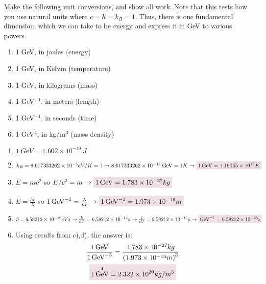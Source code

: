 \documentclass{article}
\date{Due: 01-19-2022}
\author{\EC}
\DeclareMathOperator{\GeV}{GeV}
\begin{document}
\maketitle
\begin{problem}
Make the following unit conversions, and show all work. 
Note that this tests how you use natural units where $c = \hbar = k_B = 1$. Thus, there is one 
fundamental dimension, which we can take to be energy and express it in GeV to various 
powers.
\begin{enumerate}[label=\alph*)]
    \item 1 GeV, in joules (energy) 
    \item 1 GeV, in Kelvin (temperature) 
    \item 1 GeV, in kilograms (mass) 
    \item 1 GeV$^{-1}$, in meters (length) 
    \item 1 GeV$^{-1}$, in seconds (time) 
    \item 1 GeV$^{4}$, in kg/m$^3$ (mass density) 
\end{enumerate}
\answerline
\begin{enumerate}[label=\alph*)]
    \item $1~GeV= 1.602\times10^{-10}~J$ 
    \item $k_B=8.617 333 262\times 10^{-5} eV/K=1
        \rightarrow
        8.617 333 262\times 10^{-14} \GeV=1K\rightarrow \coloredanswer{1\GeV=1.16045\times10^{13}K}$
    \item $E=mc^2$ so $E/c^2=m\rightarrow\coloredanswer{1\GeV=1.783 \times10^{-27} kg}$ 
    \item $E=\frac{hc}{\lambda}$ so $1\GeV^{-1}=\frac{\lambda}{hc}\rightarrow \coloredanswer{1\GeV^{-1}=1.973\times10^{-16}m}$
    \item $\hbar=6.58212\times10^{-16}eVs\rightarrow\frac{\hbar}{eV}=6.58212\times10^{-16}s\rightarrow\frac{1}{eV}=6.58212\times10^{-16}s\rightarrow\coloredanswer{\GeV^{-1}=6.58212\times10^{-25}s}$
    \item Using results from c),d), the answer is:
    \begin{gather*}
        \frac{1\GeV}{1\GeV^{-3}}=\frac{1.783 \times10^{-27} kg}{\qty(1.973\times10^{-16}m)^3}
        \\
        \coloredanswer{1\GeV^{4}=2.322\times10^{20} kg/m^{3}}
    \end{gather*} 
\end{enumerate}
\end{problem}
\newpage
\end{document}
